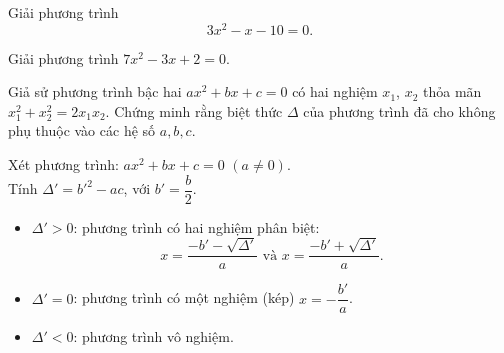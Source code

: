 \begin{vd}%
	Giải phương trình  $$3x^2-x-10=0.$$
\end{vd}

\begin{vd}%
	Giải phương trình  $7x^2 - 3x + 2 = 0$.
\end{vd}

\begin{vd}%
	Giả sử phương trình bậc hai $ax^2 + bx + c = 0$  có hai nghiệm ${x_1}$,
	${x_2}$ thỏa mãn $x_1^2 + x_2^2 = 2{x_1}{x_2}$. Chứng minh rằng biệt thức $\Delta $ của phương trình đã cho không phụ thuộc vào các hệ số $a, b, c$.
\end{vd}
\begin{note}
	Xét phương trình: $ax^2+bx+c=0$ $(a\ne 0)$.\\
	Tính $\Delta'=b'^2-ac$, với $b'=\dfrac{b}{2}$.
	\begin{itemize}
		\item $\Delta' >0$: phương trình có hai nghiệm phân biệt: 
		$$x = \frac{{ - b' - \sqrt {\Delta'}  }}{{a}}\,\,\text{và}\,\,x = \frac{{ - b' + \sqrt {\Delta'} }}{{a}}.$$
		\item $\Delta' =0$: phương trình có một nghiệm (kép) $x =  - \dfrac{b'}{{a}}$.
		\item $\Delta' <0$: phương trình vô nghiệm.
	\end{itemize}	
\end{note}

